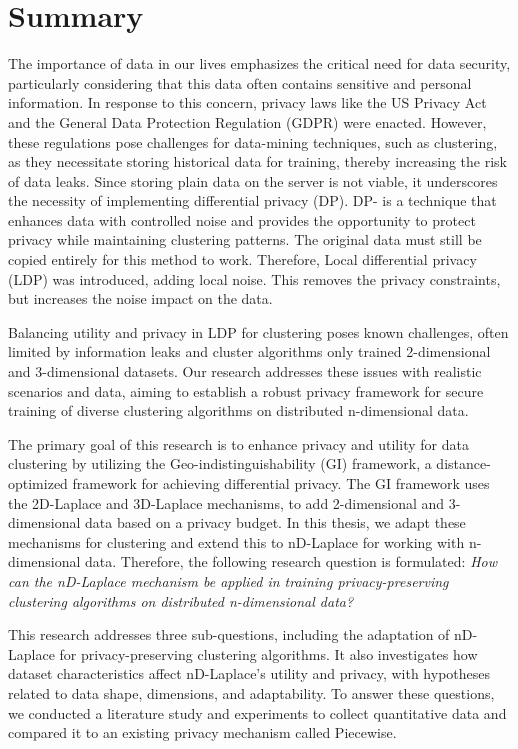 \chapter{Summary}
The importance of data in our lives emphasizes the critical need for data security, particularly considering that this data often contains sensitive and personal information. In response to this concern, privacy laws like the US Privacy Act and the General Data Protection Regulation (GDPR) were enacted. However, these regulations pose challenges for data-mining techniques, such as clustering, as they necessitate storing historical data for training, thereby increasing the risk of data leaks. Since storing plain data on the server is not viable, it underscores the necessity of implementing differential privacy (DP).
DP- is a technique that enhances data with controlled noise and provides the opportunity to protect privacy while maintaining clustering patterns.
The original data must still be copied entirely for this method to work.
Therefore, Local differential privacy (LDP) was introduced, adding local noise.
This removes the privacy constraints, but increases the noise impact on the data.

Balancing utility and privacy in LDP for clustering poses known challenges, often limited by information leaks and cluster algorithms only trained 2-dimensional and 3-dimensional datasets. Our research addresses these issues with realistic scenarios and data, aiming to establish a robust privacy framework for secure training of diverse clustering algorithms on distributed n-dimensional data. \newline

The primary goal of this research is to enhance privacy and utility for data clustering by utilizing the Geo-indistinguishability (GI) framework, a distance-optimized framework for achieving differential privacy. 
The GI framework uses the 2D-Laplace and 3D-Laplace mechanisms, to add 2-dimensional and 3-dimensional data based on a privacy budget. 
In this thesis, we adapt these mechanisms for clustering and extend this to nD-Laplace for working with n-dimensional data. 
Therefore, the following research question is formulated: \newline
\textit{How can the nD-Laplace mechanism be applied in training privacy-preserving clustering algorithms on distributed n-dimensional data?}

This research addresses three sub-questions, including the adaptation of nD-Laplace for privacy-preserving clustering algorithms. 
It also investigates how dataset characteristics affect nD-Laplace's utility and privacy, with hypotheses related to data shape, dimensions, and adaptability. 
To answer these questions, we conducted a literature study and experiments to collect quantitative data and compared it to an existing privacy mechanism called Piecewise. \newline

